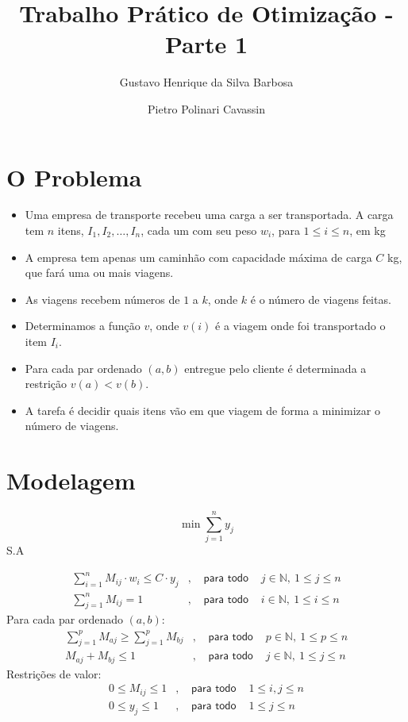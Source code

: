 \documentclass{article}
\title{Trabalho Prático de Otimização - Parte 1}
\author{
    Gustavo Henrique da Silva Barbosa
    \and
    Pietro Polinari Cavassin
}
\begin{document}
\maketitle

\section{O Problema}
\begin{itemize}
\item Uma empresa de transporte recebeu uma carga a ser transportada.
A carga tem $n$ itens, $I_1, I_2, \dots, I_n$, cada um com seu peso 
$w_i$, para $1 \le i \le n$, em kg

\item A empresa tem apenas um caminhão com capacidade máxima de carga $C$ kg,
que fará uma ou mais viagens.

\item As viagens recebem números de $1$ a $k$, onde $k$ é o número de viagens
feitas.

\item Determinamos a função $v$, onde $v(i)$ é a viagem onde foi transportado
o item $I_i$. 

\item Para cada par ordenado $(a, b)$ entregue pelo cliente é determinada a
restrição $v(a) < v(b)$.

\item A tarefa é decidir quais itens vão em que viagem de forma a minimizar
o número de viagens.
\end{itemize}

\newpage
\section{Modelagem}

$$\min \sum_{j=1}^n y_j$$
S.A 

\begin{align}
\sum_{i=1}^n M_{ij} \cdot w_i \le C \cdot y_j&, & 
    \textsf{ para todo }& j \in \mathbb{N},\ 1 \le j \le n\\
\sum_{j=1}^n M_{ij} = 1&,             & 
    \textsf{ para todo }& i \in \mathbb{N},\ 1 \le i \le n
\end{align}
Para cada par ordenado $(a,b)$:
\begin{align}
\sum_{j=1}^p M_{aj} \ge \sum_{j=1}^p M_{bj}&, & 
    \textsf{ para todo }& p \in \mathbb{N},\ 1 \le p \le n\\
M_{aj} + M_{bj} \le 1&, &
    \textsf{ para todo }& j \in \mathbb{N},\ 1 \le j \le n
\end{align}
Restrições de valor:
\begin{align}
0 \le M_{ij}\le 1&, &
    \textsf{ para todo }& 1 \le i,j \le n\\
0 \le y_{j}\le 1&, &
    \textsf{ para todo }& 1 \le j \le n
\end{align}
\end{document}
